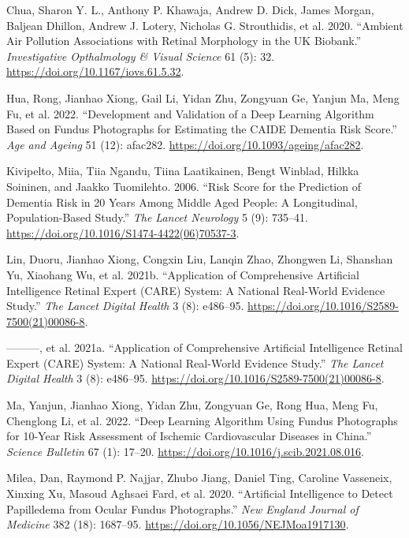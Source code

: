 \documentclass[
  Letterpaper,
]{scrbook}
\newlength{\cslhangindent}
\newenvironment{CSLReferences}[2] %
 {\begin{list}{}{%
  \setlength{\itemindent}{0pt}
  \setlength{\leftmargin}{0pt}
  \setlength{\parsep}{0pt}
  \ifodd #1
   \setlength{\leftmargin}{\cslhangindent}
   \setlength{\itemindent}{-1\cslhangindent}
  \fi
  \setlength{\itemsep}{#2\baselineskip}}}
 {\end{list}}
\begin{document}
\label{refs}
\begin{CSLReferences}{1}{0}
Chua, Sharon Y. L., Anthony P. Khawaja, Andrew D. Dick, James Morgan,
Baljean Dhillon, Andrew J. Lotery, Nicholas G. Strouthidis, et al. 2020.
{``Ambient {Air} {Pollution} {Associations} with {Retinal} {Morphology}
in the {UK} {Biobank}.''} \emph{Investigative Opthalmology \& Visual
Science} 61 (5): 32. \url{https://doi.org/10.1167/iovs.61.5.32}.

Hua, Rong, Jianhao Xiong, Gail Li, Yidan Zhu, Zongyuan Ge, Yanjun Ma,
Meng Fu, et al. 2022. {``Development and Validation of a Deep Learning
Algorithm Based on Fundus Photographs for Estimating the {CAIDE}
Dementia Risk Score.''} \emph{Age and Ageing} 51 (12): afac282.
\url{https://doi.org/10.1093/ageing/afac282}.

Kivipelto, Miia, Tiia Ngandu, Tiina Laatikainen, Bengt Winblad, Hilkka
Soininen, and Jaakko Tuomilehto. 2006. {``Risk Score for the Prediction
of Dementia Risk in 20 Years Among Middle Aged People: A Longitudinal,
Population-Based Study.''} \emph{The Lancet Neurology} 5 (9): 735--41.
\url{https://doi.org/10.1016/S1474-4422(06)70537-3}.

Lin, Duoru, Jianhao Xiong, Congxin Liu, Lanqin Zhao, Zhongwen Li,
Shanshan Yu, Xiaohang Wu, et al. 2021b. {``Application of
{Comprehensive} {Artificial} Intelligence {Retinal} {Expert} ({CARE})
System: A National Real-World Evidence Study.''} \emph{The Lancet
Digital Health} 3 (8): e486--95.
\url{https://doi.org/10.1016/S2589-7500(21)00086-8}.

---------, et al. 2021a. {``Application of {Comprehensive} {Artificial}
Intelligence {Retinal} {Expert} ({CARE}) System: A National Real-World
Evidence Study.''} \emph{The Lancet Digital Health} 3 (8): e486--95.
\url{https://doi.org/10.1016/S2589-7500(21)00086-8}.

Ma, Yanjun, Jianhao Xiong, Yidan Zhu, Zongyuan Ge, Rong Hua, Meng Fu,
Chenglong Li, et al. 2022. {``Deep Learning Algorithm Using Fundus
Photographs for 10-Year Risk Assessment of Ischemic Cardiovascular
Diseases in {China}.''} \emph{Science Bulletin} 67 (1): 17--20.
\url{https://doi.org/10.1016/j.scib.2021.08.016}.

Milea, Dan, Raymond P. Najjar, Zhubo Jiang, Daniel Ting, Caroline
Vasseneix, Xinxing Xu, Masoud Aghsaei Fard, et al. 2020. {``Artificial
{Intelligence} to {Detect} {Papilledema} from {Ocular} {Fundus}
{Photographs}.''} \emph{New England Journal of Medicine} 382 (18):
1687--95. \url{https://doi.org/10.1056/NEJMoa1917130}.


\end{CSLReferences}
\end{document}
